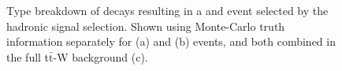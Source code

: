 \begin{figure}[htbp]
\begin{center}






\caption{\label{fig:ttwtype} Type breakdown of decays resulting in a \wj and \ttj event selected by the hadronic signal selection. Shown using Monte-Carlo truth information separately for \wj (a) and \ttj (b) events, and both combined in the full t$\bar{\textrm{t}}$-W background (c). }
\end{center}
\end{figure}


